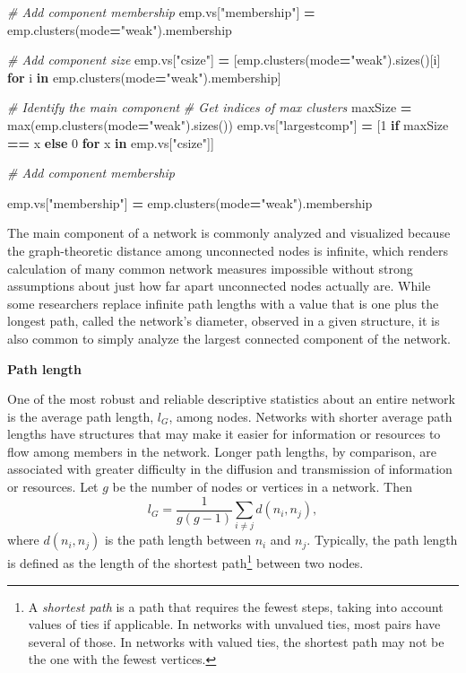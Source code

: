 \documentclass[]{krantz}
\newenvironment{Shaded}{\begin{snugshade}}{\end{snugshade}}
\newcommand{\KeywordTok}[1]{\textcolor[rgb]{0.13,0.29,0.53}{\textbf{#1}}}
\newcommand{\DecValTok}[1]{\textcolor[rgb]{0.00,0.00,0.81}{#1}}
\newcommand{\StringTok}[1]{\textcolor[rgb]{0.31,0.60,0.02}{#1}}
\newcommand{\CommentTok}[1]{\textcolor[rgb]{0.56,0.35,0.01}{\textit{#1}}}
\newcommand{\ControlFlowTok}[1]{\textcolor[rgb]{0.13,0.29,0.53}{\textbf{#1}}}
\newcommand{\OperatorTok}[1]{\textcolor[rgb]{0.81,0.36,0.00}{\textbf{#1}}}
\newcommand{\BuiltInTok}[1]{#1}
\newcommand{\NormalTok}[1]{#1}
\begin{document}
\begin{Shaded}
\begin{Highlighting}[]
\CommentTok{# Add component membership}
\NormalTok{emp.vs[}\StringTok{"membership"}\NormalTok{] }\OperatorTok{=}\NormalTok{ emp.clusters(mode}\OperatorTok{=}\StringTok{"weak"}\NormalTok{).membership}

\CommentTok{# Add component size}
\NormalTok{emp.vs[}\StringTok{"csize"}\NormalTok{] }\OperatorTok{=}\NormalTok{ [emp.clusters(mode}\OperatorTok{=}\StringTok{"weak"}\NormalTok{).sizes()[i] }\ControlFlowTok{for}\NormalTok{ i }\KeywordTok{in}\NormalTok{ emp.clusters(mode}\OperatorTok{=}\StringTok{"weak"}\NormalTok{).membership]}

\CommentTok{# Identify the main component}
\CommentTok{# Get indices of max clusters}
\NormalTok{maxSize }\OperatorTok{=} \BuiltInTok{max}\NormalTok{(emp.clusters(mode}\OperatorTok{=}\StringTok{"weak"}\NormalTok{).sizes())}
\NormalTok{emp.vs[}\StringTok{"largestcomp"}\NormalTok{] }\OperatorTok{=}\NormalTok{ [}\DecValTok{1} \ControlFlowTok{if}\NormalTok{ maxSize }\OperatorTok{==}\NormalTok{ x }\ControlFlowTok{else} \DecValTok{0} \ControlFlowTok{for}\NormalTok{ x }\KeywordTok{in}\NormalTok{ emp.vs[}\StringTok{"csize"}\NormalTok{]]}

\CommentTok{# Add component membership}

\NormalTok{emp.vs[}\StringTok{"membership"}\NormalTok{] }\OperatorTok{=}\NormalTok{ emp.clusters(mode}\OperatorTok{=}\StringTok{"weak"}\NormalTok{).membership}
\end{Highlighting}
\end{Shaded}

The main component of a network is commonly analyzed and visualized
because the graph-theoretic distance among unconnected nodes is
infinite, which renders calculation of many common network measures
impossible without strong assumptions about just how far apart
unconnected nodes actually are. While some researchers replace infinite
path lengths with a value that is one plus the longest path, called the
network's diameter, observed in a given structure, it is also common to
simply analyze the largest connected component of the network.

\textbf{Path length}

One of the most robust and reliable descriptive statistics about an
entire network is the average path length, \(l_{G}\), among nodes.
Networks with shorter average path lengths have structures that may make
it easier for information or resources to flow among members in the
network. Longer path lengths, by comparison, are associated with greater
difficulty in the diffusion and transmission of information or
resources. Let \(g\) be the number of nodes or vertices in a network.
Then \[l_G=\frac{1}{g(g-1)}\sum_{i\neq j}d(n_i,n_j),\] where
\(d(n_i,n_j)\) is the path length between \(n_i\) and \(n_j\).
Typically, the path length is defined as the length of the shortest
path\footnote{A \emph{shortest path} is a path that requires the fewest
  steps, taking into account values of ties if applicable. In networks
  with unvalued ties, most pairs have several of those. In networks with
  valued ties, the shortest path may not be the one with the fewest
  vertices.} between two nodes.
\end{document}
